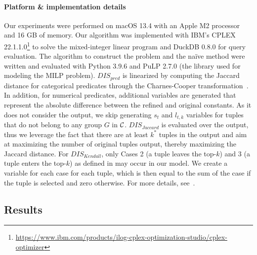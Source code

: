  

\paragraph*{\textbf{Platform \& implementation details}}
Our experiments were performed on macOS 13.4 with an Apple M2 processor and 16 GB of memory. Our algorithm was implemented with IBM's CPLEX 22.1.1.0\footnote{\url{https://www.ibm.com/products/ilog-cplex-optimization-studio/cplex-optimizer}} to solve the mixed-integer linear program and DuckDB 0.8.0 \cite{DuckDB} for query evaluation. The algorithm to construct the problem and the na\"{i}ve method were written and evaluated with Python 3.9.6 and PuLP 2.7.0 (the library used for modeling the MILP problem). $DIS_{pred}$ is linearized by computing the Jaccard distance for categorical predicates through the Charnes-Cooper transformation~\cite{CC62}. In addition, for numerical predicates, additional variables are generated that represent the absolute difference between the refined and original constants. As it does not consider the output, we skip generating $s_t$ and $l_{t, k}$ variables for tuples that do not belong to any group $G$ in $\mathcal{C}$. $DIS_{Jaccard}$ is evaluated over the output, thus we leverage the fact that there are at least $k^*$ tuples in the output and aim at maximizing the number of original tuples output, thereby maximizing the Jaccard distance.
For $DIS_{Kendall}$, only Cases 2 (a tuple leaves the top-$k$) and 3 (a tuple enters the top-$k$) as defined in \cite{FKS03} may occur in our model. We create a variable for each case for each tuple, which is then equal to the sum of the case if the tuple is selected and zero otherwise. For more details, see~\cite{Extended, impl}.





\subsection{Results}\label{sec:results}


